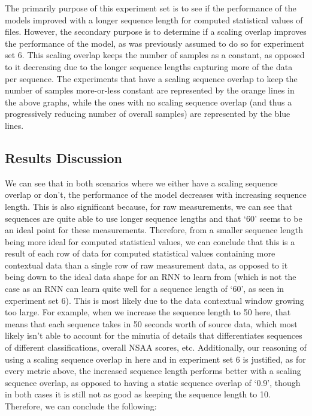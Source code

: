 \documentclass[12pt,twoside]{report}
\begin{document}
\quad The primarily purpose of this experiment set is to see if the performance of the models improved with a longer sequence length for computed statistical values of files. However, the secondary purpose is to determine if a scaling overlap improves the performance of the model, as was previously assumed to do so for experiment set 6. This scaling overlap keeps the number of samples as a constant, as opposed to it decreasing due to the longer sequence lengths capturing more of the data per sequence. The experiments that have a scaling sequence overlap to keep the number of samples more-or-less constant are represented by the orange lines in the above graphs, while the ones with no scaling sequence overlap (and thus a progressively reducing number of overall samples) are represented by the blue lines.


\subsection{Results Discussion}

\quad We can see that in both scenarios where we either have a scaling sequence overlap or don’t, the performance of the model decreases with increasing sequence length. This is also significant because, for raw measurements, we can see that sequences are quite able to use longer sequence lengths and that ‘60’ seems to be an ideal point for these measurements. Therefore, from a smaller sequence length being more ideal for computed statistical values, we can conclude that this is a result of each row of data for computed statistical values containing more contextual data than a single row of raw measurement data, as opposed to it being down to the ideal data shape for an RNN to learn from (which is not the case as an RNN can learn quite well for a sequence length of ‘60’, as seen in experiment set 6). This is most likely due to the data contextual window growing too large. For example, when we increase the sequence length to 50 here, that means that each sequence takes in 50 seconds worth of source data, which most likely isn’t able to account for the minutia of details that differentiates sequences of different classifications, overall NSAA scores, etc. Additionally, our reasoning of using a scaling sequence overlap in here and in experiment set 6 is justified, as for every metric above, the increased sequence length performs better with a scaling sequence overlap, as opposed to having a static sequence overlap of ‘0.9’, though in both cases it is still not as good as keeping the sequence length to 10. Therefore, we can conclude the following:
\end{document}
